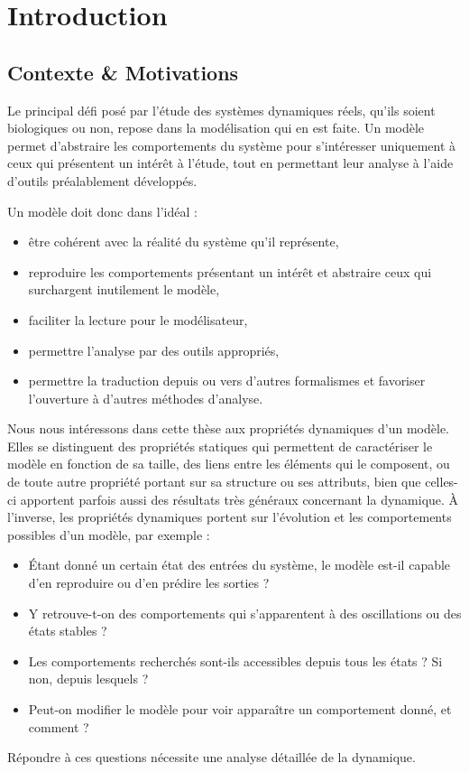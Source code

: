 
\chapter{Introduction}

\section{Contexte \& Motivations}

Le principal défi posé par l'étude des systèmes dynamiques réels,
qu'ils soient biologiques ou non,
repose dans la modélisation qui en est faite.
Un modèle permet d'abstraire les comportements du système
pour s'intéresser uniquement à ceux qui présentent un intérêt à l'étude,
tout en permettant leur analyse à l'aide d'outils préalablement développés.

Un modèle doit donc dans l'idéal :
\begin{itemize}
  \item être cohérent avec la réalité du système qu'il représente,
  \item reproduire les comportements présentant un intérêt
    et abstraire ceux qui surchargent inutilement le modèle,
  \item faciliter la lecture pour le modélisateur,
  \item permettre l'analyse par des outils appropriés,
  \item permettre la traduction depuis ou vers d'autres formalismes
    et favoriser l'ouverture à d'autres méthodes d'analyse.
\end{itemize}

Nous nous intéressons dans cette thèse aux propriétés dynamiques d'un modèle.
Elles se distinguent des propriétés statiques qui permettent de caractériser le modèle
en fonction de sa taille,
des liens entre les éléments qui le composent,
ou de toute autre propriété portant sur sa structure ou ses attributs,
bien que celles-ci apportent parfois aussi des résultats très généraux concernant la dynamique.
À l'inverse, les propriétés dynamiques portent sur l'évolution et les comportements
possibles d'un modèle, par exemple :
\begin{itemize}
  \item Étant donné un certain état des entrées du système, le modèle est-il capable
    d'en reproduire ou d'en prédire les sorties ?
  \item Y retrouve-t-on des comportements qui s'apparentent à des oscillations
    ou des états stables ?
  \item Les comportements recherchés sont-ils accessibles depuis tous les états ?
    Si non, depuis lesquels ?
  \item Peut-on modifier le modèle pour voir apparaître un comportement donné, et comment ?
\end{itemize}
Répondre à ces questions nécessite une analyse détaillée de la dynamique.

